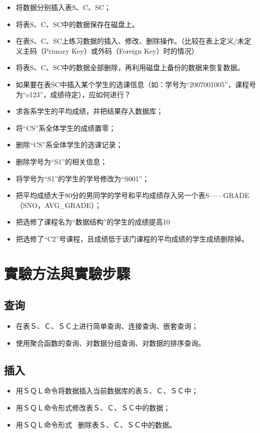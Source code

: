 \documentclass[12pt, a4paper]{report}
\begin{document}
\begin{itemize}
    \item 将数据分别插入表S、C、SC；
    \item 将表S、C、SC中的数据保存在磁盘上。
    \item 在表S、C、SC上练习数据的插入、修改、删除操作。（比较在表上定义/未定义主码（Primary Key）或外码（Foreign Key）时的情况）
    \item 将表S、C、SC中的数据全部删除，再利用磁盘上备份的数据来恢复数据。
    \item 如果要在表SC中插入某个学生的选课信息（如：学号为“2007001005”，课程号为“c123”，成绩待定），应如何进行？
    \item 求各系学生的平均成绩，并把结果存入数据库；
    \item 将“CS”系全体学生的成绩置零；
    \item 删除“CS”系全体学生的选课记录；
    \item 删除学号为“S1”的相关信息；
    \item 将学号为“S1”的学生的学号修改为“S001”；
    \item 把平均成绩大于80分的男同学的学号和平均成绩存入另一个表S——GRADE（SNO，AVG\_GRADE）；
    \item 把选修了课程名为“数据结构”的学生的成绩提高10%
    \item 把选修了“C2”号课程，且成绩低于该门课程的平均成绩的学生成绩删除掉。
\end{itemize}

\section{實驗方法與實驗步驟}

\subsection{查询}

\begin{itemize}
    \item 在表Ｓ、Ｃ、ＳＣ上进行简单查询、连接查询、嵌套查询；
    \item 使用聚合函数的查询、对数据分组查询、对数据的排序查询。
\end{itemize}

\subsection{插入}

\begin{itemize}
    \item 用ＳＱＬ命令将数据插入当前数据库的表Ｓ、Ｃ、ＳＣ中；
    \item 用ＳＱＬ命令形式修改表Ｓ、Ｃ、ＳＣ中的数据；
    \item 用ＳＱＬ命令形式  删除表Ｓ、Ｃ、ＳＣ中的数据。
\end{itemize}
\end{document}
